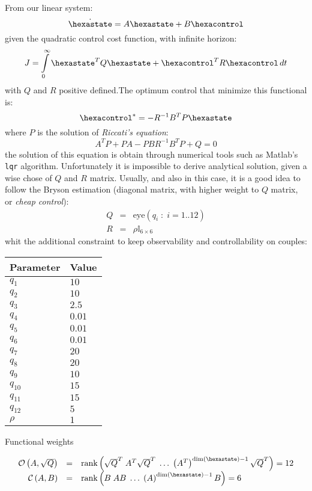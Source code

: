 From our linear system:
\begin{equation}
\dot{\hexastate} = A \hexastate + B \hexacontrol
\end{equation}
given the quadratic control cost function, with infinite horizon:
\[
J = \int\limits_{0}^{\infty} \hexastate^T Q \hexastate + \hexacontrol^T R \hexacontrol\, dt
\]
with $Q$ and $R$ positive defined.The optimum control that minimize this functional is: 
\begin{equation}
\hexacontrol^* = - R^{-1} B^T P \hexastate
\end{equation}
where $P$ is the solution of \emph{Riccati's equation}:
\[
A^T P + PA - P B R^{-1} B^T P + Q = 0
\]
the solution of this equation is obtain through numerical tools such as Matlab's \texttt{lqr} algorithm. Unfortunately it is impossible to derive analytical solution, given a wise chose of $Q$ and $R$ matrix. Usually, and also in this case, it is a good idea to follow the Bryson estimation (diagonal matrix, with higher weight to $Q$ matrix, or \emph{cheap control}):
\[
\begin{array}{rcl}
Q & = & \mathrm{eye}\left( q_i \; : \; i = 1..12 \right) \\
R & = & \rho \mathbb{I}_{6\times 6}
\end{array}
\]
whit the additional constraint to keep observability and controllability on couples:
\begin{margintable}
\renewcommand{\arraystretch}{1}
	\begin{centering}
	\begin{tabular}{p{1.5cm} p{1.5cm}}
		\hline
		\textbf{Parameter} & \textbf{Value} \\
		\hline
		$q_1$    & $10$ \\
		$q_2$    & $10$ \\
		$q_3$    & $2.5$ \\
		$q_4$    & $0.01$ \\
		$q_5$    & $0.01$ \\
		$q_6$    & $0.01$ \\
		$q_7$    & $20$ \\
		$q_8$    & $20$ \\
		$q_9$    & $10$ \\
		$q_{10}$ & $15$ \\
		$q_{11}$ & $15$ \\
		$q_{12}$ & $5$ \\
		$\rho$   & $1$ \\ \hline
	\end{tabular}
	\end{centering}
	\caption{Functional weights}
\renewcommand{\arraystretch}{1.75}	
\end{margintable}
\[
\begin{array}{rcl}
\mathcal{O}\braces{A,\sqrt{Q}} & = & \mathrm{rank}\braces{ \sqrt{Q}^T\;A^T\sqrt{Q}^T\;\dots\;\braces{A^T}^{\dim(\hexastate)-1}\sqrt{Q}^T} = 12 \\
\mathcal{C}\braces{A,B} & = & \mathrm{rank}\braces{ B\;A B\;\dots\;\braces{A}^{\dim(\hexastate)-1}B} = 6
\end{array}
\]

